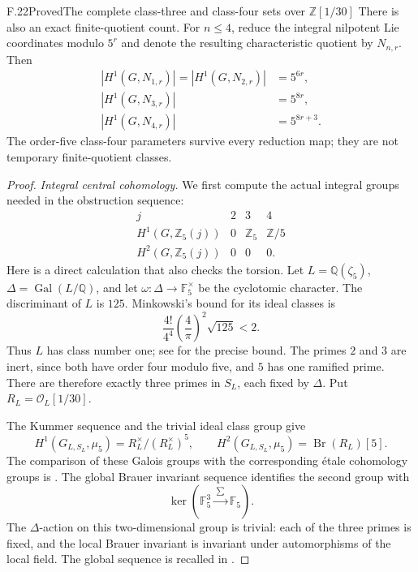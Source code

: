 \begin{statement}{F.22}{Proved}{The complete class-three and class-four sets over \(\mathbb Z[1/30]\)}
There is also an exact finite-quotient count. For \(n\leq4\),
reduce the integral nilpotent Lie coordinates modulo \(5^r\)
and denote the resulting characteristic quotient by \(N_{n,r}\).
Then
\[
 \begin{split}
 |H^1(G,N_{1,r})|=|H^1(G,N_{2,r})|&=5^{6r},\\
 |H^1(G,N_{3,r})|&=5^{8r},\\
 |H^1(G,N_{4,r})|&=5^{8r+3}.
 \end{split}                                                   \tag{F.22.5}
\]
The order-five class-four parameters survive every reduction
map; they are not temporary finite-quotient classes.
\end{statement}
\begin{proof}
\emph{Integral central cohomology.}
We first compute the actual integral groups needed in the
obstruction sequence:
\[
\begin{array}{c|ccc}
 j&2&3&4\\ \hline
 H^1(G,\mathbb Z_5(j))&0&\mathbb Z_5&\mathbb Z/5\\
 H^2(G,\mathbb Z_5(j))&0&0&0 .
\end{array}                                                    \tag{F.22.6}
\]
Here is a direct calculation that also checks the torsion.
Let \(L=\mathbb Q(\zeta_5)\), \(\Delta=\operatorname{Gal}(L/\mathbb Q)\),
and let \(\omega:\Delta\to\mathbb F_5^\times\) be the cyclotomic
character. The discriminant of \(L\) is \(125\). Minkowski's
bound for its ideal classes is
\[
       \frac{4!}{4^4}\left(\frac4\pi\right)^2\sqrt{125}<2.
\]
Thus \(L\) has class number one; see
\citet[Theorem~4.3]{FA_Milne2020ANT} for the precise bound.
The primes \(2\) and \(3\) are inert, since both have order
four modulo five, and \(5\) has one ramified prime.
There are therefore exactly three primes in \(S_L\), each
fixed by \(\Delta\). Put \(R_L=\mathcal O_L[1/30]\).

The Kummer sequence and the trivial ideal class group give
\[
 H^1(G_{L,S_L},\mu_5)=R_L^\times/(R_L^\times)^5,\qquad
 H^2(G_{L,S_L},\mu_5)=\operatorname{Br}(R_L)[5].
                                                               \tag{F.22.7}
\]
The comparison of these Galois groups with the corresponding
étale cohomology groups is
\citet[II, Proposition~2.9]{FA_Milne2006ADT}.
The global Brauer invariant sequence identifies the second
group with
\[
     \ker\!\left(\mathbb F_5^3\xrightarrow{\ \sum\ }\mathbb F_5\right).
                                                               \tag{F.22.8}
\]
The \(\Delta\)-action on this two-dimensional group is trivial:
each of the three primes is fixed, and the local Brauer
invariant is invariant under automorphisms of the local field.
The global sequence is recalled in
\citet[VI, \S8.1.1]{FA_Weibel2013}.


\end{proof}
